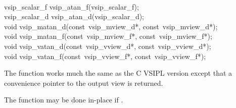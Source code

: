 \\\cvsiplh 
\begin{cfuncs}
vsip\_scalar\_f vsip\_atan\_f(vsip\_scalar\_f);\\
vsip\_scalar\_d vsip\_atan\_d(vsip\_scalar\_d);\\
void vsip\_matan\_d(const~vsip\_mview\_d*, const~vsip\_mview\_d*);\\
void vsip\_matan\_f(const~vsip\_mview\_f*, const~vsip\_mview\_f*);\\
void vsip\_vatan\_d(const~vsip\_vview\_d*, const~vsip\_vview\_d*);\\
void vsip\_vatan\_f(const~vsip\_vview\_f*, const~vsip\_vview\_f*);\\
\end{cfuncs}
\pyjvsiph
{}
\begin{comments}
\item{The  function works much the same as the C VSIPL version except that a convenience pointer to the output view is returned. 
\item The  function may be done in-place if .}
\end{comments}